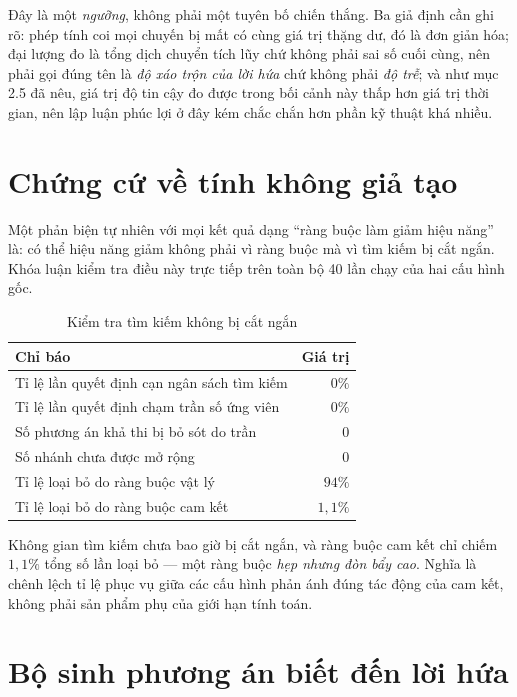 Đây là một \emph{ngưỡng}, không phải một tuyên bố chiến thắng. Ba giả định cần ghi rõ: phép tính
coi mọi chuyến bị mất có cùng giá trị thặng dư, đó là đơn giản hóa; đại lượng đo là tổng dịch
chuyển tích lũy chứ không phải sai số cuối cùng, nên phải gọi đúng tên là \emph{độ xáo trộn của
lời hứa} chứ không phải \emph{độ trễ}; và như mục 2.5 đã nêu, giá trị độ tin cậy đo được trong
bối cảnh này thấp hơn giá trị thời gian, nên lập luận phúc lợi ở đây kém chắc chắn hơn phần kỹ
thuật khá nhiều.

\section{Chứng cứ về tính không giả tạo}
\label{muc:chungcu}

Một phản biện tự nhiên với mọi kết quả dạng ``ràng buộc làm giảm hiệu năng'' là: có thể hiệu
năng giảm không phải vì ràng buộc mà vì tìm kiếm bị cắt ngắn. Khóa luận kiểm tra điều này trực
tiếp trên toàn bộ 40 lần chạy của hai cấu hình gốc.

\begin{table}[htbp]
\centering
\caption{Kiểm tra tìm kiếm không bị cắt ngắn}
\label{bang:khonggiatao}
\small
\begin{tabular}{@{}lr@{}}
\toprule
\textbf{Chỉ báo} & \textbf{Giá trị}\\
\midrule
Tỉ lệ lần quyết định cạn ngân sách tìm kiếm & $0\%$\\
Tỉ lệ lần quyết định chạm trần số ứng viên & $0\%$\\
Số phương án khả thi bị bỏ sót do trần & 0\\
Số nhánh chưa được mở rộng & 0\\
Tỉ lệ loại bỏ do ràng buộc vật lý & $94\%$\\
Tỉ lệ loại bỏ do ràng buộc cam kết & $1{,}1\%$\\
\bottomrule
\end{tabular}
\end{table}

Không gian tìm kiếm chưa bao giờ bị cắt ngắn, và ràng buộc cam kết chỉ chiếm $1{,}1\%$ tổng số
lần loại bỏ --- một ràng buộc \emph{hẹp nhưng đòn bẩy cao}. Nghĩa là chênh lệch tỉ lệ phục vụ
giữa các cấu hình phản ánh đúng tác động của cam kết, không phải sản phẩm phụ của giới hạn tính
toán.

\section{Bộ sinh phương án biết đến lời hứa}
\label{muc:bosinh}

